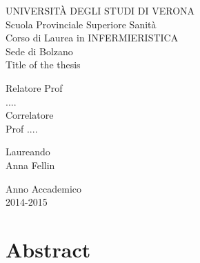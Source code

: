 \documentclass[11pt,a4paper,oneside]{book}
\begin{document}
\frontmatter

\def\title{Title of the thesis}
\def\author{Name of the student}
\def\advisor{Name of the supervisor}
\def\date{July, 2013}

\begin{titlepage}
\vspace{30pt}
\begin{center}
\Large UNIVERSIT\`A DEGLI STUDI DI VERONA\\Scuola Provinciale Superiore Sanit\`a\\\vspace{40pt}
Corso di Laurea in INFERMIERISTICA\\Sede di Bolzano\\\vspace{30pt} {\huge\title}\\\vspace{30pt}
\end{center}

\vspace{30pt}

\begin{flushleft}
Relatore
Prof \\....\\
\vspace{15pt}
Correlatore\\
Prof ....
\end{flushleft}

\vspace{15pt}

\begin{flushright}
Laureando\\
Anna Fellin
\end{flushright}

\vspace{30pt}

\begin{center} Anno Accademico \\ 2014-2015 \end{center}

\end{titlepage}

\tableofcontents

\mainmatter


\chapter*{Abstract}
\end{document}
